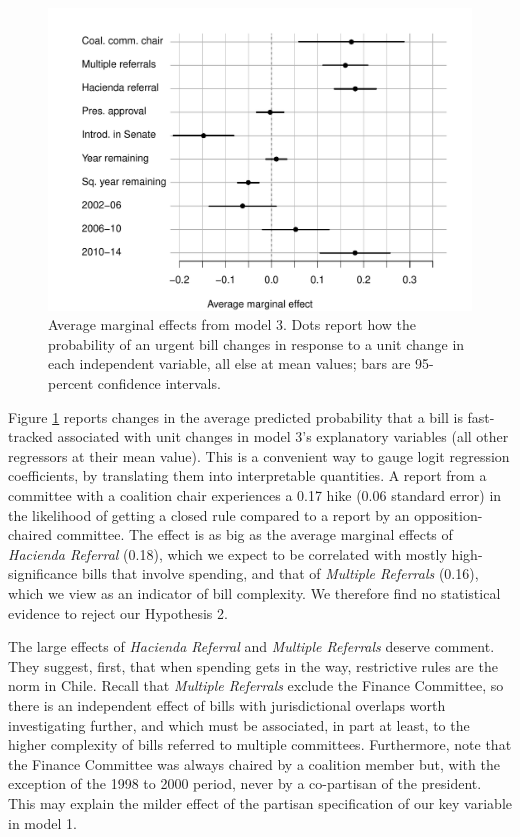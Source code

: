 \documentclass[letter,12pt]{article}
\begin{document}
\begin{figure}
  \centering
    \caption{Average marginal effects from model 3. Dots report how the probability of an urgent bill changes in response to a unit change in each independent variable, all else at mean values; bars are 95-percent confidence intervals.}\label{F:avgMg}
    \includegraphics[width=.8\columnwidth]{../graphs/avgMgEffects.pdf}
\end{figure}

Figure \ref{F:avgMg} reports changes in the average predicted probability that a bill is fast-tracked associated with unit changes in model 3's explanatory variables (all other regressors at their mean value). This is a convenient way to gauge logit regression coefficients, by translating them into interpretable quantities. A report from a committee with a coalition chair experiences a 0.17 hike (0.06 standard error) in the likelihood of getting a closed rule compared to a report by an opposition-chaired committee. The effect is as big as the average marginal effects of \emph{Hacienda Referral} (0.18), which we expect to be correlated with mostly high-significance bills that involve spending, and that of \emph{Multiple Referrals} (0.16), which we view as an indicator of bill complexity. We therefore find no statistical evidence to reject our Hypothesis 2.  

The large effects of \emph{Hacienda Referral} and \emph{Multiple Referrals} deserve comment. They suggest, first, that when spending gets in the way, restrictive rules are the norm in Chile. Recall that \emph{Multiple Referrals} exclude the Finance Committee, so there is an independent effect of bills with jurisdictional overlaps worth investigating further, and which must be associated, in part at least, to the higher complexity of bills referred to multiple committees. Furthermore, note that the Finance Committee was always chaired by a coalition member but, with the exception of the 1998 to 2000 period, never by a co-partisan of the president. This may explain the milder effect of the partisan specification of our key variable in model 1. 
\end{document}
